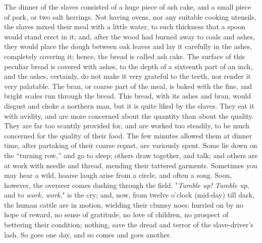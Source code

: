 The dinner of the slaves consisted of a huge piece of ash cake, and a
small piece of pork, or two salt {}herrings. Not having ovens, nor any
suitable cooking utensils, the slaves mixed their meal with a little
water, to such thickness that a spoon would stand erect in it; and,
after the wood had burned away to coals and ashes, they would place the
dough between oak leaves and lay it carefully in the ashes, completely
covering it; hence, the bread is called ash cake. The surface of this
peculiar bread is covered with ashes, to the depth of a sixteenth part
of an inch, and the ashes, certainly, do not make it very grateful to
the teeth, nor render it very palatable. The bran, or coarse part of the
meal, is baked with the fine, and bright scales run through the bread.
This bread, with its ashes and bran, would disgust and choke a northern
man, but it is quite liked by the slaves. They eat it with avidity, and
are more concerned about the quantity than about the quality. They are
far too scantily provided for, and are worked too steadily, to be much
concerned for the quality of their food. The few minutes allowed them at
dinner time, after partaking of their coarse repast, are variously
spent. Some lie down on the ``turning row,'' and go to sleep; others
draw together, and talk; and others are at work with needle and thread,
mending their tattered garments. Sometimes you may hear a wild, hoarse
laugh arise from a circle, and often a song. Soon, however, the overseer
comes dashing through the field. "\emph{Tumble up! Tumble up}, and to
\emph{work, work}," is the cry; and, now, from twelve o'clock (mid-day)
till dark, the human cattle are in motion, wielding their clumsy noes;
hurried on by no hope of reward, no sense of gratitude, no love of
children, no prospect of bettering {}their condition; nothing, save the
dread and terror of the slave-driver's lash. So goes one day, and so
comes and goes another.

